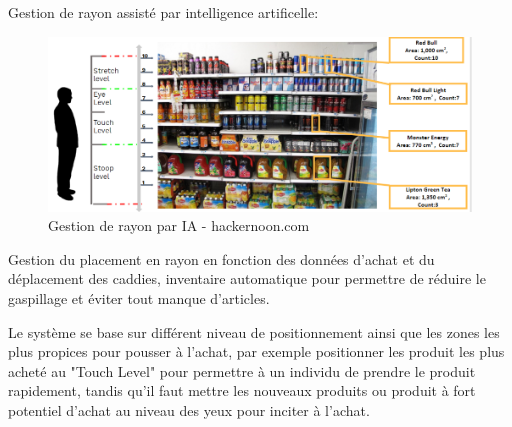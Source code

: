     Gestion de rayon assisté par intelligence artificelle: 
    
    \begin{figure}[H]
        \centering
        \includegraphics[width=1\textwidth]{Images/shelfAI}
        \caption{Gestion de rayon par IA - hackernoon.com }
        \label{fig:shelfAI}
    \end{figure}

    Gestion du placement en rayon en fonction des données d'achat et du déplacement 
    des caddies, inventaire automatique pour permettre de réduire 
    le gaspillage et éviter tout manque d'articles. \newline 

    Le système se base sur différent niveau de positionnement ainsi que les 
    zones les plus propices pour pousser à l'achat, par exemple 
    positionner les produit les plus acheté au "Touch Level" pour permettre 
    à un individu de prendre le produit rapidement, tandis qu'il faut mettre 
    les nouveaux produits ou produit à fort potentiel d'achat au niveau 
    des yeux pour inciter à l'achat. \newline 


    
    
        